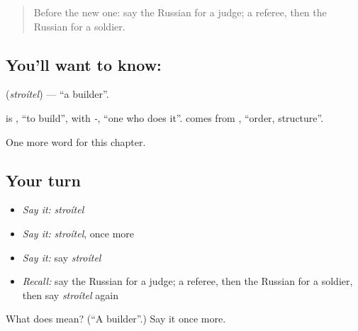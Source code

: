 \label{lesson:RU-C171-stroitel}



\begin{quote}
Before the new one: say the Russian for a judge; a referee, then the Russian for a soldier.
\end{quote}

\subsection*{You'll want to know: }
\textbf{} (\emph{stroítel}) — \textquotedblleft{}a builder\textquotedblright{}.

\begin{cousinweb}
\textbf{} is \emph{}, \textquotedblleft{}to build\textquotedblright{}, with \emph{-}, \textquotedblleft{}one who does it\textquotedblright{}. \emph{} comes from \emph{}, \textquotedblleft{}order, structure\textquotedblright{}.
\end{cousinweb}

\begin{grammarlens}[title={What you've built}]
One more word for this chapter.
\end{grammarlens}

\subsection*{Your turn}
\begin{itemize}
\raggedright
  \item \emph{Say it:} \emph{stroítel}
  \item \emph{Say it:} \emph{stroítel}, once more
  \item \emph{Say it:} say \emph{stroítel}
  \item \emph{Recall:} say the Russian for a judge; a referee, then the Russian for a soldier, then say \emph{stroítel} again
\end{itemize}

\begin{tcolorbox}[breakable,colback=teal!4,colframe=teal!35!black,title={Before you move on}]
What does  mean? (\textquotedblleft{}A builder\textquotedblright{}.) Say it once more.
\end{tcolorbox}
